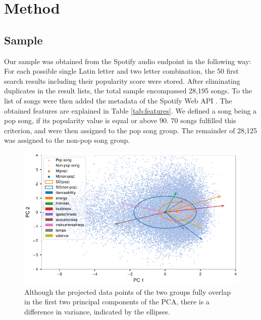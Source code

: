 \documentclass{article}
\begin{document}
\section{Method}

\subsection{Sample}
Our sample was obtained from the Spotify audio endpoint in the following way: For each possible single Latin letter and two letter combination, the 50 first search results including their popularity score were stored. After eliminating duplicates in the result lists, the total sample encompassed 28,195 songs. To the list of songs were then added the metadata of the Spotify Web API \citep{spotifyDocu}.
The obtained features are explained in Table \ref{tab:features}. We defined a song being a pop song, if its popularity value is equal or above 90. 70 songs fulfilled this criterion, and were then assigned to the pop song group. The remainder of 28,125 was assigned to the non-pop song group. 

\begin{figure}[!b]
  \centering
  \includegraphics[]{../fig/001_pca.pdf}
  \vspace*{-8mm}  
  \caption{Although the projected data points of the two groups fully overlap in the first two principal components of the PCA, there is a difference in variance, indicated by the ellipses.}
  \label{fig:pca}
\end{figure}
\end{document}
